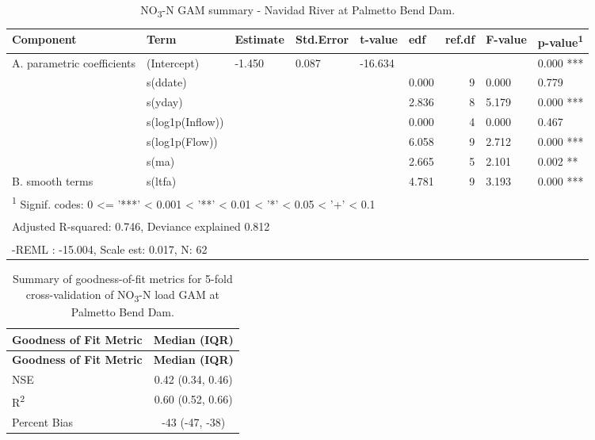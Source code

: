 \documentclass[
]{article}
\newenvironment{widestuff}{\begin{table}[h]\begin{adjustwidth}{-4.5cm}{-4.5cm}\centering}{\end{adjustwidth}\end{table}}
\begin{document}
\begin{widestuff}

\caption{NO\textsubscript{3}-N GAM summary - Navidad River at Palmetto Bend Dam.}
\centering
\begin{tabular}[t]{llllllrll}
\toprule
Component & Term & Estimate & Std.Error & t-value & edf & ref.df & F-value & p-value\textsuperscript{1}\\
\midrule
A. parametric coefficients & (Intercept) & -1.450 & 0.087 & -16.634 &  &  &  & 0.000 ***\\
\cmidrule{1-9}
 & s(ddate) &  &  &  & 0.000 & 9 & 0.000 & 0.779\\

 & s(yday) &  &  &  & 2.836 & 8 & 5.179 & 0.000 ***\\

 & s(log1p(Inflow)) &  &  &  & 0.000 & 4 & 0.000 & 0.467\\

 & s(log1p(Flow)) &  &  &  & 6.058 & 9 & 2.712 & 0.000 ***\\

 & s(ma) &  &  &  & 2.665 & 5 & 2.101 & 0.002 **\\

\multirow[t]{-6}{*}{\raggedright\arraybackslash B. smooth terms} & s(ltfa) &  &  &  & 4.781 & 9 & 3.193 & 0.000 ***\\
\bottomrule
\multicolumn{9}{l}{\textsuperscript{1} Signif. codes: 0 <= '***' < 0.001 < '**' < 0.01 < '*' < 0.05 < '+' < 0.1}\\
\multicolumn{9}{l}{\textsuperscript{} Adjusted R-squared: 0.746, Deviance explained 0.812}\\
\multicolumn{9}{l}{\textsuperscript{} -REML : -15.004, Scale est: 0.017, N: 62}\\
\end{tabular}
\end{widestuff}

\hypertarget{tbl-NO3PalmettoBend-CV}{}
\begin{longtable}[]{@{}lc@{}}
\caption{\label{tbl-NO3PalmettoBend-CV}Summary of goodness-of-fit
metrics for 5-fold cross-validation of NO\textsubscript{3}-N load GAM at
Palmetto Bend Dam.}\tabularnewline
\toprule()
\textbf{Goodness of Fit Metric} & \textbf{Median (IQR)} \\
\midrule()
\endfirsthead
\toprule()
\textbf{Goodness of Fit Metric} & \textbf{Median (IQR)} \\
\midrule()
\endhead
NSE & 0.42 (0.34, 0.46) \\
R\textsuperscript{2} & 0.60 (0.52, 0.66) \\
Percent Bias & -43 (-47, -38) \\
\bottomrule()
\end{longtable}
\end{document}
